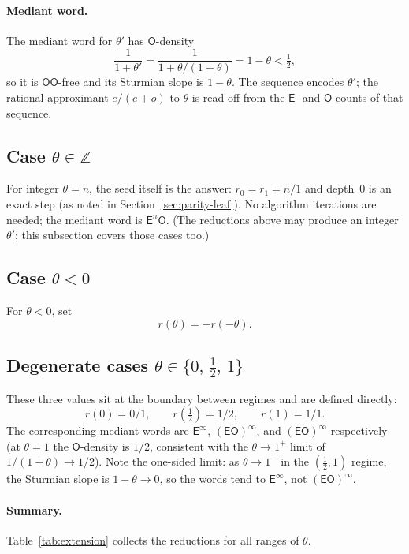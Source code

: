 \documentclass[12pt]{article}
\theoremstyle{definition}
\theoremstyle{remark}
\theoremstyle{plain}
\newcommand{\OO}{\mathsf{O}}
\newcommand{\EE}{\mathsf{E}}
\begin{document}
\paragraph{Mediant word.}
The mediant word for $\theta'$ has $\OO$-density
\[
  \frac{1}{1 + \theta'} = \frac{1}{1 + \theta/(1-\theta)} = 1 - \theta < \tfrac{1}{2},
\]
so it is $\OO\OO$-free and its Sturmian slope is $1 - \theta$.
The sequence encodes $\theta'$; the rational approximant $e/(e+o)$ to $\theta$ is read
off from the $\EE$- and $\OO$-counts of that sequence.

\subsection{Case $\theta \in \mathbb{Z}$}

For integer $\theta = n$, the seed itself is the answer: $r_0 = r_1 = n/1$ and
depth~$0$ is an exact step (as noted in Section~\ref{sec:parity-leaf}).
No algorithm iterations are needed; the mediant word is $\EE^n\OO$.
(The reductions above may produce an integer $\theta'$; this subsection covers
those cases too.)

\subsection{Case $\theta < 0$}

For $\theta < 0$, set
\[
  r(\theta) = -r(-\theta).
\]

\subsection{Degenerate cases $\theta \in \{0,\,\tfrac{1}{2},\,1\}$}

These three values sit at the boundary between regimes and are defined directly:
\[
  r(0) = 0/1, \qquad r(\tfrac{1}{2}) = 1/2, \qquad r(1) = 1/1.
\]
The corresponding mediant words are $\EE^\infty$, $(\EE\OO)^\infty$, and
$(\EE\OO)^\infty$ respectively (at $\theta = 1$ the $\OO$-density is $1/2$,
consistent with the $\theta \to 1^+$ limit of $1/(1+\theta) \to 1/2$).
Note the one-sided limit: as $\theta \to 1^-$ in the $(\tfrac{1}{2}, 1)$ regime,
the Sturmian slope is $1 - \theta \to 0$, so the words tend to $\EE^\infty$,
not $(\EE\OO)^\infty$.

\paragraph{Summary.}
Table~\ref{tab:extension} collects the reductions for all ranges of $\theta$.
\end{document}
